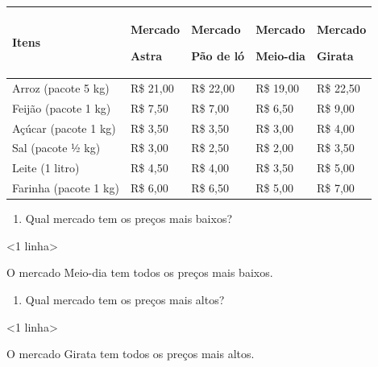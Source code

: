 \begin{longtable}[]{@{}lllll@{}}
\toprule
\begin{minipage}[b]{0.19\columnwidth}\raggedright\strut
Itens\strut
\end{minipage} & \begin{minipage}[b]{0.19\columnwidth}\raggedright\strut
Mercado

Astra\strut
\end{minipage} & \begin{minipage}[b]{0.19\columnwidth}\raggedright\strut
Mercado

Pão de ló\strut
\end{minipage} & \begin{minipage}[b]{0.19\columnwidth}\raggedright\strut
Mercado

Meio-dia\strut
\end{minipage} & \begin{minipage}[b]{0.19\columnwidth}\raggedright\strut
Mercado

Girata\strut
\end{minipage}\tabularnewline
\midrule
\endhead
Arroz (pacote 5 kg) & R\$ 21,00 & R\$ 22,00 & R\$ 19,00 & R\$
22,50\tabularnewline
Feijão (pacote 1 kg) & R\$ 7,50 & R\$ 7,00 & R\$ 6,50 & R\$
9,00\tabularnewline
Açúcar (pacote 1 kg) & R\$ 3,50 & R\$ 3,50 & R\$ 3,00 & R\$
4,00\tabularnewline
Sal (pacote ½ kg) & R\$ 3,00 & R\$ 2,50 & R\$ 2,00 & R\$
3,50\tabularnewline
Leite (1 litro) & R\$ 4,50 & R\$ 4,00 & R\$ 3,50 & R\$
5,00\tabularnewline
Farinha (pacote 1 kg) & R\$ 6,00 & R\$ 6,50 & R\$ 5,00 & R\$
7,00\tabularnewline
\bottomrule
\end{longtable}

\begin{enumerate}
\def\labelenumi{\alph{enumi})}
\item
  Qual mercado tem os preços mais baixos?
\end{enumerate}

\textless{}1 linha\textgreater{}

O mercado Meio-dia tem todos os preços mais baixos.

\begin{enumerate}
\def\labelenumi{\alph{enumi})}
\item
  Qual mercado tem os preços mais altos?
\end{enumerate}

\textless{}1 linha\textgreater{}

O mercado Girata tem todos os preços mais altos.

